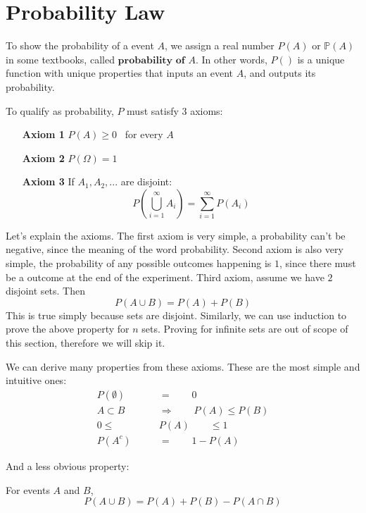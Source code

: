 \section{Probability Law}
To show the probability of a event $A$, we assign a real number $P(A)$ or $\mathbb{P}(A)$ in some textbooks, called $\textbf{probability of $A$}$. In other words, $P()$ is a unique function with unique properties that inputs an event $A$, and outputs its probability.
\par 
To qualify as probability, $P$ must satisfy $3$ axioms:
\begin{itemize}
    \item[\textbf{Axiom 1}] $P(A) \ge 0$ \ for every $A$
    \item[\textbf{Axiom 2}] $P(\Omega)=1$
    \item[\textbf{Axiom 3}] If $A_1,A_2,...$ are disjoint: 
    $$P \left( \bigcup^{\infty}_{i=1} A_i \right)= \sum^{\infty}_{i=1}P(A_i) $$
\end{itemize}

\par
Let's explain the axioms. The first axiom is very simple, a probability can't be negative, since the meaning of the word probability.
Second axiom is also very simple, the probability of any possible outcomes happening is $1$, since there must be a outcome at the end of the experiment.
Third axiom, assume we have $2$ disjoint sets. Then
$$P(A \cup B)= P(A)+P(B)$$
This is true simply because sets are disjoint. Similarly, we can use induction to prove the above property for $n$ sets. Proving for infinite sets are out of scope of this section, therefore we will skip it.

\par
We can derive many properties from these axioms. These are the most simple and intuitive ones:
$$ \begin{aligned}
    P(\emptyset) \qquad &= \qquad 0 \\
    A \subset B \qquad &\Longrightarrow  \qquad P(A) \le P(B) \\
    0 \le       \qquad &P(A) \qquad \le 1 \\ 
    P(A^c)  \qquad  & = \qquad 1- P(A)
\end{aligned}$$ 

And a less obvious property: 
\begin{lemma} For  events $A$ and $B$,
    $$ P \left(A \cup B\right)= P(A)+P(B)-P(A \cap B)$$
\end{lemma}


